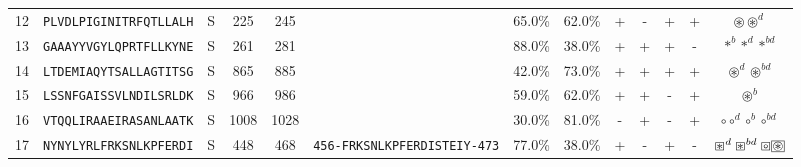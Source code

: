 \begin{tabular}{rcccccccccccc}
12 &  \texttt{PLVDLPIGINITRFQTLLALH} &       S &    225 &   245 &                                                                  &                          65.0\% &                           62.0\% &          + &           - &          + &           + &                                                                                                                               $ \circledast \circledast^d $ \\
13 &  \texttt{GAAAYYVGYLQPRTFLLKYNE} &       S &    261 &   281 &                                                                  &                          88.0\% &                           38.0\% &          + &           + &          + &           - &                                                                                                                                 $ \ast^b \ast^d \ast^{bd} $ \\
14 &  \texttt{LTDEMIAQYTSALLAGTITSG} &       S &    865 &   885 &                                                                  &                          42.0\% &                           73.0\% &          + &           + &          + &           + &                                                                                                                          $ \circledast^d \circledast^{bd} $ \\
15 &  \texttt{LSSNFGAISSVLNDILSRLDK} &       S &    966 &   986 &                                                                  &                          59.0\% &                           62.0\% &          + &           + &          - &           + &                                                                                                                                           $ \circledast^b $ \\
16 &  \texttt{VTQQLIRAAEIRASANLAATK} &       S &   1008 &  1028 &                                                                  &                          30.0\% &                           81.0\% &          - &           + &          - &           + &                                                                                                                        $ \circ \circ^d \circ^b \circ^{bd} $ \\
17 &  \texttt{NYNYLYRLFRKSNLKPFERDI} &       S &    448 &   468 &  \texttt{{\scriptsize 456-}FRKSNLKPFERDISTEIY{\scriptsize -473}} &                          77.0\% &                           38.0\% &          + &           - &          + &           - &                                                                       $ \boxast^d \boxast^{bd} \boxcircle \setlength{\fboxsep}{0.5pt} \boxed{\circledast} $ \\

\end{tabular}
